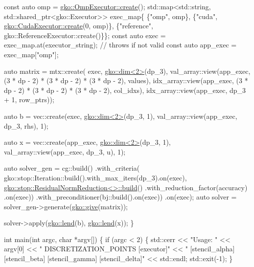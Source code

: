 \begin{DoxyCodeInclude}
    \textcolor{keyword}{const} \textcolor{keyword}{auto} omp = \hyperlink{classgko_1_1OmpExecutor_a33ca05fdd0fc928ee262fc9425304874}{gko::OmpExecutor::create}();
    std::map<std::string, std::shared\_ptr<gko::Executor>> exec\_map\{
        \{\textcolor{stringliteral}{"omp"}, omp\},
        \{\textcolor{stringliteral}{"cuda"}, \hyperlink{classgko_1_1CudaExecutor_a2718a92034350650ef406ffdb60db090}{gko::CudaExecutor::create}(0, omp)\},
        \{\textcolor{stringliteral}{"reference"}, gko::ReferenceExecutor::create()\}\};
    \textcolor{keyword}{const} \textcolor{keyword}{auto} exec = exec\_map.at(executor\_string);  \textcolor{comment}{// throws if not valid}
    \textcolor{keyword}{const} \textcolor{keyword}{auto} app\_exec = exec\_map[\textcolor{stringliteral}{"omp"}];


    \textcolor{keyword}{auto} matrix = mtx::create(
        exec, \hyperlink{structgko_1_1dim}{gko::dim<2>}(dp\_3),
        val\_array::view(app\_exec, (3 * dp - 2) * (3 * dp - 2) * (3 * dp - 2),
                        values),
        idx\_array::view(app\_exec, (3 * dp - 2) * (3 * dp - 2) * (3 * dp - 2),
                        col\_idxs),
        idx\_array::view(app\_exec, dp\_3 + 1, row\_ptrs));

    \textcolor{keyword}{auto} b = vec::create(exec, \hyperlink{structgko_1_1dim}{gko::dim<2>}(dp\_3, 1),
                         val\_array::view(app\_exec, dp\_3, rhs), 1);

    \textcolor{keyword}{auto} x = vec::create(app\_exec, \hyperlink{structgko_1_1dim}{gko::dim<2>}(dp\_3, 1),
                         val\_array::view(app\_exec, dp\_3, u), 1);

    \textcolor{keyword}{auto} solver\_gen =
        cg::build()
            .with\_criteria(
                gko::stop::Iteration::build().with\_max\_iters(dp\_3).on(exec),
                \hyperlink{classgko_1_1stop_1_1ResidualNormReduction}{gko::stop::ResidualNormReduction<>::build}()
                    .with\_reduction\_factor(accuracy)
                    .on(exec))
            .with\_preconditioner(bj::build().on(exec))
            .on(exec);
    \textcolor{keyword}{auto} solver = solver\_gen->generate(\hyperlink{namespacegko_acbd3fd6d07e498892881e8e2ab0b4167}{gko::give}(matrix));

    solver->apply(\hyperlink{namespacegko_aa8cb4876b72e5e1036ea9575443c439b}{gko::lend}(b), \hyperlink{namespacegko_aa8cb4876b72e5e1036ea9575443c439b}{gko::lend}(x));
\}

\textcolor{keywordtype}{int} main(\textcolor{keywordtype}{int} argc, \textcolor{keywordtype}{char} *argv[])
\{
    \textcolor{keywordflow}{if} (argc < 2) \{
        std::cerr
            << \textcolor{stringliteral}{"Usage: "} << argv[0] << \textcolor{stringliteral}{" DISCRETIZATION\_POINTS [executor]"}
            << \textcolor{stringliteral}{" [stencil\_alpha] [stencil\_beta] [stencil\_gamma] [stencil\_delta]"}
            << std::endl;
        std::exit(-1);
    \}


\end{DoxyCodeInclude}
